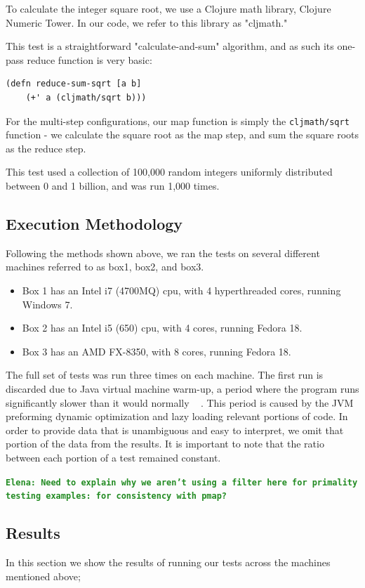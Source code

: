 \documentclass[12pt]{article}
\newcommand{\comment}[1]{{\bf \tt  {#1}}}
\newcommand{\emcomment}[1]{\textcolor{ForestGreen}{\comment{Elena: {#1}}}}
\begin{document}
To calculate the integer square root, we use a Clojure math library, Clojure Numeric Tower. In our code, we refer to this library as "cljmath."

This test is a straightforward "calculate-and-sum" algorithm, and as such its one-pass reduce function is very basic:

\begin{verbatim}
(defn reduce-sum-sqrt [a b] 
    (+' a (cljmath/sqrt b)))
\end{verbatim}

For the multi-step configurations, our map function is simply the \texttt{cljmath/sqrt} function - we calculate the square root as the map step, and sum the square roots as the reduce step.
 
This test used a collection of 100,000 random integers uniformly distributed between 0 and 1 billion, and was run 1,000 times.
 
 \subsection{Execution Methodology}\label{sec:eMethods}
 Following the methods shown above, we ran the tests on several different machines referred to as box1, box2, and box3.
 
\begin{itemize}
 \item 
 Box 1 has an Intel i7 (4700MQ) cpu, with 4 hyperthreaded cores, running Windows 7.
 \item
 Box 2 has an Intel i5 (650) cpu, with 4 cores, running Fedora 18.
 \item
 Box 3 has an AMD FX-8350, with 8 cores, running Fedora 18. 
 \end{itemize}
  
The full set of tests was run three times on each machine. The first run is discarded due to Java virtual machine warm-up, a period where the program runs significantly slower than it would normally ~\cite{Blackburn:2008} . This period is caused by the JVM preforming dynamic optimization and lazy loading relevant portions of code. In order to provide data that is unambiguous and easy to interpret, we omit that portion of the data from the results. It is important to note that the ratio between each portion of a test remained constant.

\emcomment{Need to explain why we aren't using a filter here for primality testing examples: for consistency with pmap?}

\subsection{Results}\label{sec:results}
In this section we show the results of running our tests across the machines mentioned above;
\end{document}
